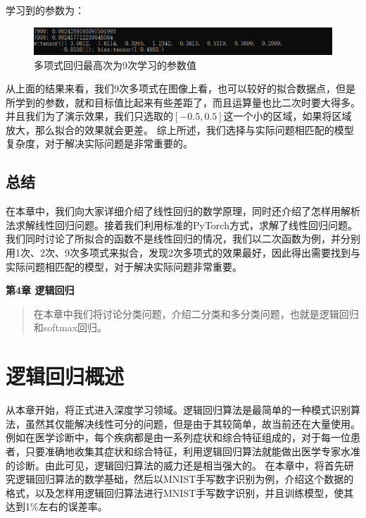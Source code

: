 \documentclass[UTF8]{article}
\begin{document}
学习到的参数为：
\begin{figure}[H]
	\caption{多项式回归最高次为9次学习的参数值}
	\label{f000022}
	\centering
	\includegraphics[width=15cm]{images/f000022}
\end{figure}
从上面的结果来看，我们9次多项式在图像上看，也可以较好的拟合数据点，但是所学到的参数，就和目标值比起来有些差距了，而且运算量也比二次时要大得多。并且我们为了演示效果，我们只选取的$[-0.5, 0.5]$这一个小的区域，如果将区域放大，那么拟合的效果就会更差。\newline
综上所述，我们选择与实际问题相匹配的模型复杂度，对于解决实际问题是非常重要的。
\subsection{总结}
在本章中，我们向大家详细介绍了线性回归的数学原理，同时还介绍了怎样用解析法求解线性回归问题。接着我们利用标准的PyTorch方式，求解了线性回归问题。我们同时讨论了所拟合的函数不是线性回归的情况，我们以二次函数为例，并分别用1次、2次、9次多项式来拟合，发现2次多项式的效果最好，因此得出需要找到与实际问题相匹配的模型，对于解决实际问题非常重要。






\newpage
\maketitle
\begin{center}
\Large \textbf{第4章 逻辑回归} \quad \textbf{}
\end{center}
\begin{abstract}
在本章中我们将讨论分类问题，介绍二分类和多分类问题，也就是逻辑回归和softmax回归。
\end{abstract}
\section{逻辑回归概述}
从本章开始，将正式进入深度学习领域。逻辑回归算法是最简单的一种模式识别算法，虽然其仅能解决线性可分的问题，但是由于其较简单，故当前还在大量使用。例如在医学诊断中，每个疾病都是由一系列症状和综合特征组成的，对于每一位患者，只要准确地收集其症状和综合特征，利用逻辑回归算法就能做出医学专家水准的诊断。由此可见，逻辑回归算法的威力还是相当强大的。
在本章中，将首先研究逻辑回归算法的数学基础，然后以MNIST手写数字识别为例，介绍这个数据的格式，以及怎样用逻辑回归算法进行MNIST手写数字识别，并且训练模型，使其达到1\%左右的误差率。
\end{document}
